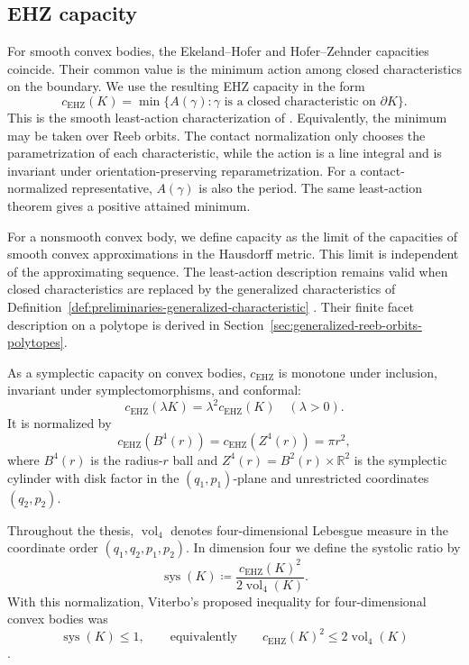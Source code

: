 \subsection{EHZ capacity}\label{subsec:preliminaries-smooth-symplectic-geometry}

For smooth convex bodies, the Ekeland--Hofer and Hofer--Zehnder capacities
coincide. Their common value is the minimum action among closed
characteristics on the boundary. We use the resulting EHZ capacity in
the form
\begin{equation}\label{eq:preliminaries-ehz-capacity}
  c_{\mathrm{EHZ}}(K)
  = \min\{A(\gamma):\gamma
    \text{ is a closed characteristic on }\partial K\}.
\end{equation}
This is the smooth least-action characterization of
\cite[Theorem~2.2]{AAO2014}.
Equivalently, the minimum may be taken over Reeb orbits. The contact
normalization only chooses the parametrization of each characteristic, while
the action is a line integral and is invariant under orientation-preserving
reparametrization. For a contact-normalized representative, \(A(\gamma)\) is
also the period. The same least-action theorem gives a positive attained
minimum.

For a nonsmooth convex body, we define capacity as the limit of the
capacities of smooth convex approximations in the Hausdorff metric. This
limit is independent of the approximating sequence. The least-action
description remains valid when closed characteristics are replaced by the
generalized characteristics of
Definition~\ref{def:preliminaries-generalized-characteristic}
\cite[Proposition~2.7]{AAO2014}. Their finite
facet description on a polytope is derived in
Section~\ref{sec:generalized-reeb-orbits-polytopes}.

As a symplectic capacity on convex bodies, \(c_{\mathrm{EHZ}}\) is monotone
under inclusion, invariant under symplectomorphisms, and conformal:
\[
  c_{\mathrm{EHZ}}(\lambda K)=\lambda^2c_{\mathrm{EHZ}}(K)
  \quad(\lambda>0).
\]
It is normalized by
\[
  c_{\mathrm{EHZ}}(B^4(r))=c_{\mathrm{EHZ}}(Z^4(r))=\pi r^2,
\]
where \(B^4(r)\) is the radius-\(r\) ball and
\(Z^4(r)=B^2(r)\times\mathbb{R}^2\) is the symplectic cylinder with
disk factor in the \((q_1,p_1)\)-plane and unrestricted coordinates
\((q_2,p_2)\).

Throughout the thesis, \(\operatorname{vol}_4\) denotes four-dimensional
Lebesgue measure in the coordinate order \((q_1,q_2,p_1,p_2)\). In dimension
four we define the systolic ratio by
\begin{equation}\label{eq:preliminaries-systolic-ratio}
  \operatorname{sys}(K)
  \coloneqq
  \frac{c_{\mathrm{EHZ}}(K)^2}{2\operatorname{vol}_4(K)}.
\end{equation}
With this normalization, Viterbo's proposed inequality for four-dimensional convex
bodies was
\[
  \operatorname{sys}(K)\leq 1,
  \qquad\text{equivalently}\qquad
  c_{\mathrm{EHZ}}(K)^2\leq 2\operatorname{vol}_4(K)
\]
\cite{Viterbo2000}.

